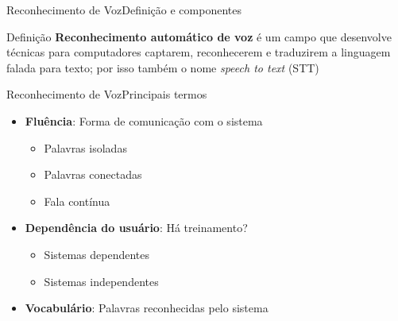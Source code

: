\begin{frame}{Reconhecimento de Voz}{Definição e componentes}

\begin{block}{Definição}
\textbf{Reconhecimento automático de voz} é um campo que desenvolve técnicas para computadores captarem, reconhecerem e traduzirem a linguagem falada para texto; por isso também o nome \textit{speech to text} (STT)
\end{block}


\end{frame}


\begin{frame}{Reconhecimento de Voz}{Principais termos}

\begin{itemize}
\item \textbf{Fluência}: Forma de comunicação com o sistema
\begin{itemize}
  \item Palavras isoladas
  \item Palavras conectadas
  \item Fala contínua
\end{itemize}

\item<2-> \textbf{Dependência do usuário}: Há treinamento?
\begin{itemize}
  \item Sistemas dependentes
  \item Sistemas independentes
\end{itemize}

\item<3-> \textbf{Vocabulário}: Palavras reconhecidas pelo sistema
\end{itemize}
\end{frame}
